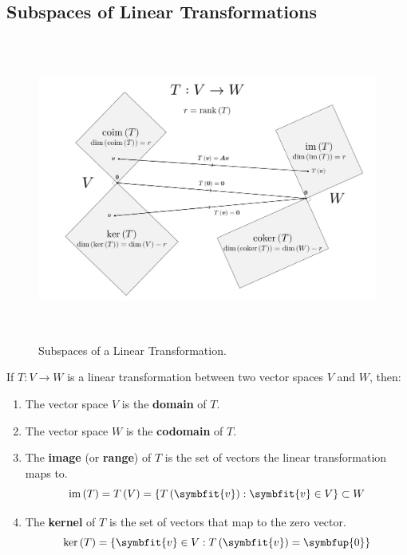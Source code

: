 \documentclass{article}
\begin{document}
\subsection{Subspaces of Linear Transformations}
\begin{figure}[H]
    \centering
    \includegraphics[height=10cm, keepaspectratio]{figures/matrix_transformation.pdf}
    \caption{Subspaces of a Linear Transformation.}
\end{figure}
\begin{definition}
    If \(T:V \rightarrow W\) is a linear transformation between two
    vector spaces \(V\) and \(W\), then:
    \begin{enumerate}
        \item The vector space \(V\) is the \textbf{domain} of \(T\).
        \item The vector space \(W\) is the \textbf{codomain} of \(T\).
        \item The \textbf{image} (or \textbf{range}) of \(T\) is the set
              of vectors the linear transformation maps to.
              \begin{equation*}
                  \vim{\left( T \right)} = T\left(V\right) = \left\{ T\left(\symbfit{v}\right) : \symbfit{v}\in V \right\} \subset W
              \end{equation*}
        \item The \textbf{kernel} of \(T\) is the set of vectors that
              map to the zero vector.
              \begin{equation*}
                  \vker{\left( T \right)} = \left\{ \symbfit{v}\in V : T\left(\symbfit{v}\right)=\symbfup{0} \right\}
              \end{equation*}
    \end{enumerate}
\end{definition}
\end{document}
